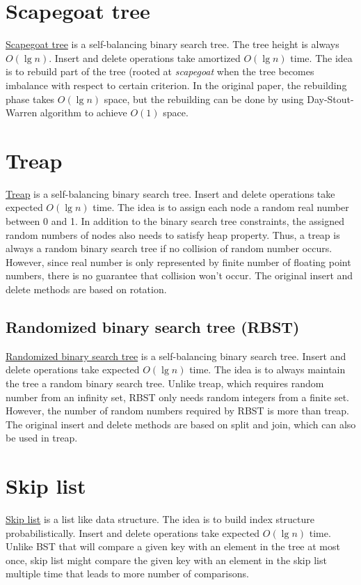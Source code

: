 \section{Scapegoat tree}
\href{https://en.wikipedia.org/wiki/Scapegoat_tree}{Scapegoat tree} is a self-balancing binary search tree. The tree height is always $O(\lg n)$. Insert and delete operations take amortized $O(\lg n)$ time. The idea is to rebuild part of the tree (rooted at \emph{scapegoat} when the tree becomes imbalance with respect to certain criterion. In the original paper, the rebuilding phase takes $O(\lg n)$ space, but the rebuilding can be done by using Day-Stout-Warren algorithm to achieve $O(1)$ space.

\section{Treap}
\href{https://en.wikipedia.org/wiki/Treap}{Treap} is a self-balancing binary search tree. Insert and delete operations take expected $O(\lg n)$ time. The idea is to assign each node a random real number between 0 and 1. In addition to the binary search tree constraints, the assigned random numbers of nodes also needs to satisfy heap property. Thus, a treap is always a random binary search tree if no collision of random number occurs. However, since real number is only represented by finite number of floating point numbers, there is no guarantee that collision won't occur. The original insert and delete methods are based on rotation.

\subsection{Randomized binary search tree (RBST)}
\href{https://en.wikipedia.org/wiki/Treap#Randomized_binary_search_tree}{Randomized binary search tree}  is a self-balancing binary search tree. Insert and delete operations take expected $O(\lg n)$ time. The idea is to always maintain the tree a random binary search tree. Unlike treap, which requires random number from an infinity set, RBST only needs random integers from a finite set. However, the number of random numbers required by RBST is more than treap.
The original insert and delete methods are based on split and join, which can also be used in treap.

\section{Skip list}
\href{https://en.wikipedia.org/wiki/Skip_list}{Skip list} is a list like data structure. The idea is to build index structure probabilistically. Insert and delete operations take expected $O(\lg n)$ time. Unlike BST that will compare a given key with an element in the tree at most once, skip list might compare  the given key with an element in the skip list multiple time that leads to more number of comparisons.

